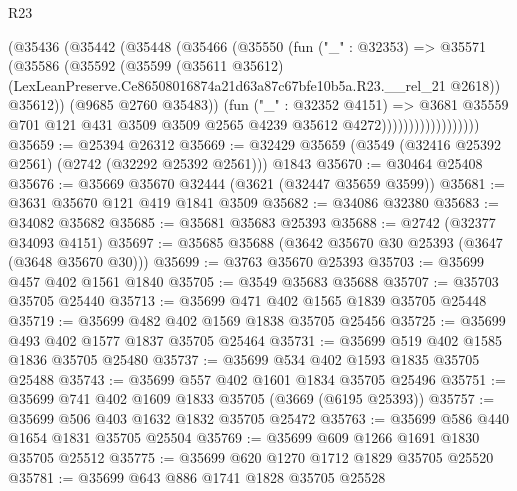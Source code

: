 \begin{lexlean}{R23}
\begin{coremodule}
                            (@35436
                              (@35442
                                (@35448
                                  (@35466
                                    (@35550
                                      (fun ("_" : @32353) =>
                                      @35571
                                        (@35586
                                          (@35592
                                            (@35599
                                              (@35611 @35612)
                                              (LexLeanPreserve.Ce86508016874a21d63a87c67bfe10b5a.R23.__rel_21
                                                @2618))
                                            @35612))
                                        (@9685 @2760 @35483))
                                      (fun ("_" : @32352 @4151) =>
                                      @3681
                                        @35559
                                        @701
                                        @121
                                        @431
                                        @3509
                                        @3509
                                        @2565
                                        @4239
                                        @35612
                                        @4272))))))))))))))))))
@35659 := @25394 @26312
@35669 := @32429 @35659 (@3549 (@32416 @25392 @2561) (@2742 (@32292 @25392 @2561))) @1843
@35670 := @30464 @25408
@35676 := @35669 @35670 @32444 (@3621 (@32447 @35659 @3599))
@35681 := @3631 @35670 @121 @419 @1841 @3509
@35682 := @34086 @32380
@35683 := @34082 @35682
@35685 := @35681 @35683 @25393
@35688 := @2742 (@32377 @34093 @4151)
@35697 := @35685 @35688 (@3642 @35670 @30 @25393 (@3647 (@3648 @35670 @30)))
@35699 := @3763 @35670 @25393
@35703 := @35699 @457 @402 @1561 @1840
@35705 := @3549 @35683 @35688
@35707 := @35703 @35705 @25440
@35713 := @35699 @471 @402 @1565 @1839 @35705 @25448
@35719 := @35699 @482 @402 @1569 @1838 @35705 @25456
@35725 := @35699 @493 @402 @1577 @1837 @35705 @25464
@35731 := @35699 @519 @402 @1585 @1836 @35705 @25480
@35737 := @35699 @534 @402 @1593 @1835 @35705 @25488
@35743 := @35699 @557 @402 @1601 @1834 @35705 @25496
@35751 := @35699 @741 @402 @1609 @1833 @35705 (@3669 (@6195 @25393))
@35757 := @35699 @506 @403 @1632 @1832 @35705 @25472
@35763 := @35699 @586 @440 @1654 @1831 @35705 @25504
@35769 := @35699 @609 @1266 @1691 @1830 @35705 @25512
@35775 := @35699 @620 @1270 @1712 @1829 @35705 @25520
@35781 := @35699 @643 @886 @1741 @1828 @35705 @25528

\end{coremodule}
\end{lexlean}
